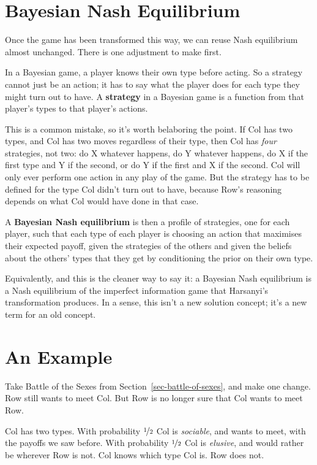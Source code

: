 \documentclass[
  11pt,
  letterpaper,
]{scrbook}
\begin{document}
\section{Bayesian Nash Equilibrium}\label{sec-bne}

Once the game has been transformed this way, we can reuse Nash
equilibrium almost unchanged. There is one adjustment to make first.

In a Bayesian game, a player knows their own type before acting. So a
strategy cannot just be an action; it has to say what the player does
for each type they might turn out to have. A \textbf{strategy} in a
Bayesian game is a function from that player's types to that player's
actions.

This is a common mistake, so it's worth belaboring the point. If Col has
two types, and Col has two moves regardless of their type, then Col has
\emph{four} strategies, not two: do X whatever happens, do Y whatever
happens, do X if the first type and Y if the second, or do Y if the
first and X if the second. Col will only ever perform one action in any
play of the game. But the strategy has to be defined for the type Col
didn't turn out to have, because Row's reasoning depends on what Col
would have done in that case.

A \textbf{Bayesian Nash equilibrium} is then a profile of strategies,
one for each player, such that each type of each player is choosing an
action that maximises their expected payoff, given the strategies of the
others and given the beliefs about the others' types that they get by
conditioning the prior on their own type.

Equivalently, and this is the cleaner way to say it: a Bayesian Nash
equilibrium is a Nash equilibrium of the imperfect information game that
Harsanyi's transformation produces. In a sense, this isn't a new
solution concept; it's a new term for an old concept.

\section{An Example}\label{sec-bayesian-example}

Take Battle of the Sexes from Section~\ref{sec-battle-of-sexes}, and
make one change. Row still wants to meet Col. But Row is no longer sure
that Col wants to meet Row.

Col has two types. With probability \(\nicefrac{1}{2}\) Col is
\emph{sociable}, and wants to meet, with the payoffs we saw before. With
probability \(\nicefrac{1}{2}\) Col is \emph{elusive}, and would rather
be wherever Row is not. Col knows which type Col is. Row does not.
\end{document}
